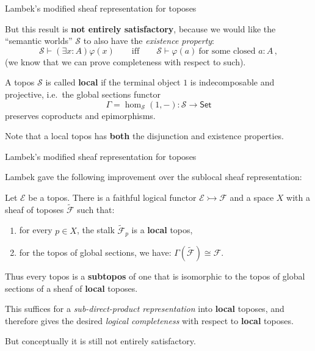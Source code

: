 \documentclass{beamer}
\newcommand{\E}{\ensuremath{\mathcal{E}}}
\newcommand{\myemph}[1]{\textbf{#1}}    %
\newcommand{\Set}{\mathsf{Set}}
\begin{document}
\begin{frame}{Lambek's modified sheaf representation for toposes}

But this result is \myemph{not entirely satisfactory}, because we would like the ``semantic worlds'' $\mathcal{S}$ to also have the \emph{existence property}:
\[
\mathcal{S}\vdash (\exists x:A)\varphi(x) \qquad\text{iff}\qquad  \mathcal{S}\vdash \varphi(a)\ \text{for some closed $a:A$}\,,
\] 
(we know that we can prove completeness with respect to such).
\medskip

\begin{definition}
A topos $\mathcal{S}$ is called \myemph{local} if the terminal object $1$ is indecomposable and projective, i.e.\ the global sections functor 
\[
\Gamma = \hom_\mathcal{S}(1, - ) : \mathcal{S} \to \Set
\]
preserves coproducts and epimorphisms.
\end{definition}
\medskip

Note that a local topos has \myemph{both} the disjunction and existence properties.

\end{frame}
\begin{frame}{Lambek's modified sheaf representation for toposes}

Lambek gave the following improvement over the sublocal sheaf representation:

\begin{theorem}[Lambek 1989]
Let $\E$ be a topos.  
There is a faithful logical functor $\E\rightarrowtail\mathcal{F}$ 
and a space $X$ with a sheaf of toposes 
$\tilde{\mathcal{F}}$ such that:
\begin{enumerate}
\item for every $p\in X$, the stalk $\tilde{\mathcal{F}}_p$ is a \myemph{local} topos, 
\item for the topos of global sections, we have: $\Gamma(\tilde{\mathcal{F}}) \cong \mathcal{F}$.
\end{enumerate}
Thus every topos is a \myemph{subtopos} of one that is isomorphic to the topos of global sections of a sheaf of \myemph{local} toposes.  
\end{theorem}
\medskip

This suffices for a \emph{sub-direct-product representation} into \myemph{local} toposes, and therefore gives the desired \emph{logical completeness} with respect to \myemph{local} toposes.  

But conceptually it is still not entirely satisfactory.

\end{frame}
\end{document}
